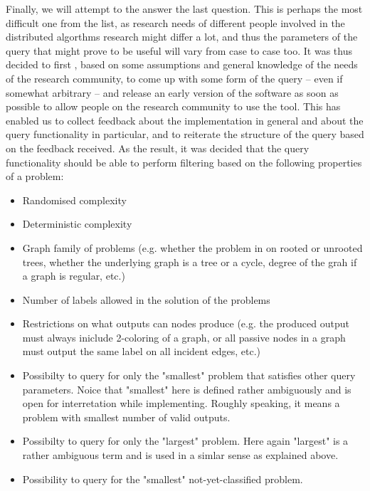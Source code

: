 Finally, we will attempt to the answer the last question.
This is perhaps the most difficult one from the list,
as research needs of different people involved in 
the distributed algorthms research might differ a lot, and thus
the parameters of the query that might prove to be useful
will vary from case to case too. It was thus decided to first
, based on some assumptions and general knowledge of the
needs of the research community, to come up with some form of the
query -- even if somewhat arbitrary -- and release an early version
of the software as soon as possible to allow people on the
research community to use the tool. This has enabled us to
collect feedback about the implementation in general and about the
query functionality in particular, and to reiterate the structure of
the query based on the feedback received. As the result, it was
decided that the query functionality should be able to perform
filtering based on the following properties of a problem:

\begin{itemize}
  \item Randomised complexity
  \item Deterministic complexity
  \item Graph family of problems (e.g. whether the problem in on
  rooted or unrooted trees, whether the underlying graph is a tree
  or a cycle, degree of the grah if a graph is regular, etc.)
  \item Number of labels allowed in the solution of the problems
  \item Restrictions on what outputs can nodes produce (e.g. the
  produced output must always iniclude 2-coloring of a graph,
  or all passive nodes in a graph must output the same
  label on all incident edges, etc.)
  \item Possibilty to query for only the "smallest" problem that
  satisfies other query parameters. Noice that "smallest" here is
  defined rather ambiguously and is open for interretation while implementing. Roughly speaking, it means a problem with smallest
  number of valid outputs.
  \item Possibilty to query for only the "largest" problem. Here again
  "largest" is a rather ambiguous term and is used in a simlar sense
  as explained above.
  \item Possibility to query for the "smallest" not-yet-classified problem.
\end{itemize}
